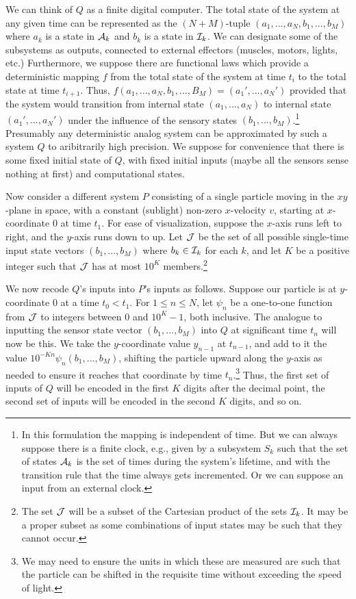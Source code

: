 We can think of $Q$ as a finite digital computer. The total state of the system at any given time can be represented as the
$(N+M)$-tuple $(a_1,...,a_N,b_1,...,b_M)$ where $a_k$ is a state in $\mathcal A_k$ and $b_k$ is a state in $\mathcal I_k$. We can designate some of
the subsystems as outputs, connected to external effectors (muscles, motors, lights, etc.)  Furthermore, we suppose there are functional laws which provide a 
deterministic mapping $f$ from the total state of the system at time $t_i$ to the total state at time $t_{i+1}$. Thus, $f(a_1,...,a_N,b_1,...,B_M)= (a_1',...,a_N')$ 
provided that the system would transition from internal state $(a_1,...,a_N)$ to internal state $(a_1',...,a_N')$
under the influence of the sensory states $(b_1,...,b_M)$.\footnote{In this formulation the mapping is independent of time. But we 
can always suppose there is a finite clock, e.g., given by a subsystem $S_k$ such that the set of states $\mathcal A_k$ is
the set of times during the system's lifetime, and with the transition rule that the time always gets incremented. Or we can suppose an input
from an external clock.} Presumably any deterministic analog system can be approximated by such a system $Q$ to aribitrarily high precision.
We suppose for convenience that there is some fixed initial state of $Q$, with fixed initial inputs (maybe all
the sensors sense nothing at first) and computational states.

Now consider a different system $P$ consisting of a single particle moving in the $xy$-plane in space, with a constant 
(sublight) non-zero $x$-velocity $v$, starting at $x$-coordinate $0$ at time $t_1$. For ease of visualization, suppose the $x$-axis
runs left to right, and the $y$-axis runs down to up.
Let $\mathcal J$ be the set of all possible
single-time input state vectors $(b_1,...,b_M)$ where $b_k \in\mathcal I_k$ for each $k$, and let $K$ be a positive integer such
that $\mathcal J$ has at most $10^K$ members.\footnote{The set $\mathcal J$ will be a subset of the Cartesian product of the
sets $\mathcal I_k$. It may be a proper subset as some combinations of input states may be such that they cannot occur.}

We now recode $Q$'s inputs into $P$'s inputs as follows. Suppose our particle is at $y$-coordinate $0$ at a time $t_0<t_1$. 
For $1\le n\le N$, let $\psi_n$ be a one-to-one function from $\mathcal J$ to integers between $0$ and $10^K-1$, both inclusive. The analogue 
to inputting the sensor state vector $(b_1,...,b_M)$ into $Q$ at significant time $t_n$ will now be this. We take
the $y$-coordinate value $y_{n-1}$ at $t_{n-1}$, and add to it the value $10^{-Kn} \psi_n(b_1,...,b_M)$, shifting the particle
upward along the $y$-axis as needed to ensure it reaches that coordinate by time $t_n$.\footnote{We may need to ensure the units in which
these are measured are such that the particle can be shifted in the requisite time without exceeding the speed of light.} Thus, 
the first set of inputs of $Q$ will be encoded in the first $K$ digits after the decimal point, the second set of inputs
will be encoded in the second $K$ digits, and so on.

